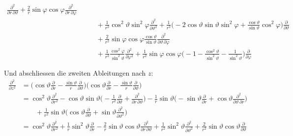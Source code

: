 \begin{align*}
\frac{\partial^2}{\partial r\,\partial\vartheta}
+
\frac2r
\sin\varphi\cos\varphi
\frac{\partial^2}{\partial r\,\partial\varphi}
\\
&\qquad
+
\frac1{r^2}\cos^2\vartheta\sin^2\varphi
\frac{\partial^2}{\partial\vartheta^2}
+
\frac1{r^2}
\biggl(
-2\cos\vartheta\sin\vartheta\sin^2\varphi
+\frac{\cos\vartheta}{\sin\vartheta}\cos^2\varphi
\biggr)
\frac{\partial}{\partial\vartheta}
\\
&\qquad
+
\frac2{r^2}\sin\varphi\cos\varphi\frac{\cos\vartheta}{\sin\vartheta}
\frac{\partial^2}{\partial\vartheta\,\partial\varphi}
\\
&\qquad
+
\frac1{r^2}\frac{\cos^2\varphi}{\sin^2\vartheta}
\frac{\partial^2}{\partial\varphi^2}
+
\frac1{r^2}
\sin\varphi\cos\varphi
\biggl(
-1
-
\frac{\cos^2\vartheta}{\sin^2\vartheta}
-\frac1{\sin^2\vartheta}
\biggr)
\frac{\partial}{\partial\varphi}
\end{align*}

Und abschliessen die zweiten Ableitungen nach $z$:
\begin{align*}
\frac{\partial^2}{\partial z^2}
&=
\biggl(
\cos\vartheta
\frac{\partial}{\partial r}
-
\frac{\sin\vartheta}{r}
\frac{\partial}{\partial\vartheta}
\biggr)
\biggl(
\cos\vartheta
\frac{\partial}{\partial r}
-
\frac{\sin\vartheta}{r}
\frac{\partial}{\partial\vartheta}
\biggr)
\\
&=
\cos^2\vartheta\frac{\partial^2}{\partial r^2}
-
\cos\vartheta \sin\vartheta\biggl(
-\frac1{r^2}\frac{\partial}{\partial\vartheta}
+\frac{\partial^2}{\partial r\,\partial\vartheta}
\biggr)
-
\frac1r\sin\vartheta\biggl(
-\sin\vartheta\frac{\partial}{\partial r}
+\cos\vartheta\frac{\partial^2}{\partial\vartheta\,\partial r}
\biggr)
\\
&\qquad
+
\frac1{r^2}\sin\vartheta\biggl(
\cos\vartheta\frac{\partial}{\partial\vartheta}
+\sin\vartheta\frac{\partial^2}{\partial\vartheta^2}
\biggr)
\\
&=\cos^2\vartheta\frac{\partial^2}{\partial r^2}
+
\frac1r\sin^2\vartheta\frac{\partial}{\partial r}
-
\frac2{r}\sin\vartheta\cos\vartheta
\frac{\partial^2}{\partial r\,\partial\vartheta}
+
\frac1{r^2}\sin^2\vartheta \frac{\partial^2}{\partial\vartheta^2}
+
\frac2{r^2}\sin\vartheta\cos\vartheta \frac{\partial}{\partial\vartheta}
\end{align*}

